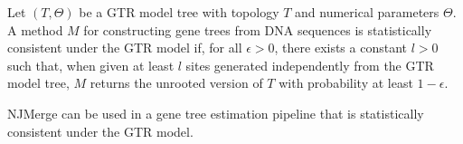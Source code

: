 
\begin{definition}
\label{def:sc-gene}
Let $(T,\Theta)$ be a GTR model tree with topology $T$ and numerical parameters $\Theta$.
A method $M$ for constructing gene trees from DNA sequences is statistically consistent under the GTR model if, for all $\epsilon > 0$, there exists a constant $ l > 0$ such that, when given at least $l$ sites generated independently from the GTR model tree, $M$ returns the unrooted version of $T$ with probability at least $1 - \epsilon$.
\end{definition}

\begin{corollary}
\label{cor:sc-gene}
NJMerge can be used in a gene tree estimation pipeline that is statistically consistent under the GTR model. 
\end{corollary}
